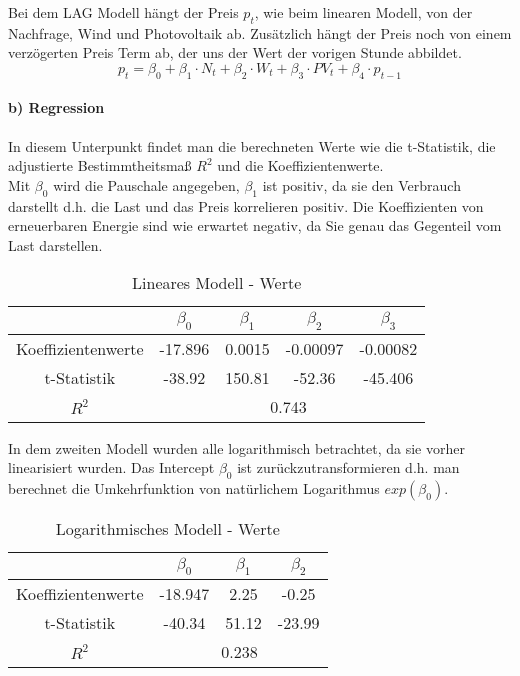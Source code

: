 \documentclass{eegreport}
\begin{document}
Bei dem LAG Modell hängt der Preis $p_t$, wie beim linearen Modell, von der Nachfrage, Wind und Photovoltaik ab. Zusätzlich hängt der Preis noch von einem verzögerten Preis Term ab, der uns der Wert der vorigen Stunde abbildet. 
\begin{equation}
p_t = \beta_0 + \beta_1 \cdot N_t + \beta_2 \cdot W_t + \beta_3 \cdot PV_t + \beta_4 \cdot p_{t-1}
\end{equation}


\newpage
\paragraph{b) Regression} \mbox{} \newline\newline
In diesem Unterpunkt findet man die berechneten Werte wie die t-Statistik, die adjustierte Bestimmtheitsmaß $R^2$ und die Koeffizientenwerte. \\

Mit $\beta_0$ wird die Pauschale angegeben, $\beta_1$ ist positiv, da sie den Verbrauch darstellt d.h. die Last und das Preis korrelieren positiv. Die Koeffizienten von erneuerbaren Energie sind wie erwartet negativ, da Sie genau das Gegenteil vom Last darstellen.

\begin{table}[h]
\begin{center}
\begin{tabular}{|c|c|c|c|c|}
\hline 
 & $\beta_0$ & $\beta_1$ & $\beta_2$ & $\beta_3$ \\ 
\hline 
Koeffizientenwerte & -17.896 & 0.0015 & -0.00097 & -0.00082 \\ 
\hline 
t-Statistik & -38.92 & 150.81 & -52.36 & -45.406 \\ 
\hline 
$R^{2}$ & \multicolumn{4}{c|}{0.743} \\ 
\hline 
\end{tabular} 
\end{center}
\caption{Lineares Modell - Werte}
\label{lin1}
\end{table}

In dem zweiten Modell wurden alle logarithmisch betrachtet, da sie vorher linearisiert wurden. Das Intercept $\beta_0$ ist zurückzutransformieren d.h. man berechnet die Umkehrfunktion von natürlichem Logarithmus $exp(\beta_0)$.

\begin{table}[h]
\begin{center}
\begin{tabular}{|c|c|c|c|}
\hline 
 & $\beta_0$ & $\beta_1$ & $\beta_2$ \\ 
\hline 
Koeffizientenwerte & -18.947 & 2.25 & -0.25 \\ 
\hline 
t-Statistik & -40.34 & 51.12 & -23.99 \\ 
\hline 
$R^2$ & \multicolumn{3}{c|}{0.238} \\ 
\hline 
\end{tabular} 
\end{center}
\caption{Logarithmisches Modell - Werte}
\label{log1}
\end{table}
\end{document}
